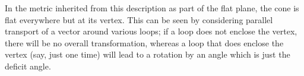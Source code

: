 \eject

\begin{figure}[h]
  \centerline{
  }
\end{figure}

\noindent In the metric inherited from this description as part of the 
flat plane, the cone is flat everywhere but at its vertex.  This can
be seen by considering parallel transport of a vector around various
loops; if a loop does not enclose the vertex, there will be no overall
transformation, whereas a loop that does enclose the vertex (say, just
one time) will lead to a rotation by an angle which is just the
deficit angle.

\begin{figure}[h]
  \centerline{
  }
\end{figure}

